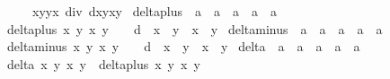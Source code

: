 \begin{isabellebody}
\ \ \ \ \ {\isacharparenleft}xyyx\ div\ {\isacharparenleft}{}{\isacharplus}d{\isacharasterisk}xyxy\isanewline
\isanewline
{}\isamarkupfalse%
\ delta{\isacharunderscore}plus\ {\isacharcolon}{\isacharcolon}\ {\isachardoublequoteopen}{\isacharprime}a\ {\isasymRightarrow}\ {\isacharprime}a\ {\isasymRightarrow}\ {\isacharprime}a\ {\isasymRightarrow}\ {\isacharprime}a\ {\isasymRightarrow}\ {\isacharprime}a{\isachardoublequoteclose}\ \isanewline
\ {\isachardoublequoteopen}delta{\isacharunderscore}plus\ x{}\ y{}\ x{}\ y{}\ {\isacharequal}\ {}\ {\isacharplus}\ d\ {\isacharasterisk}\ x{}\ {\isacharasterisk}\ y{}\ {\isacharasterisk}\ x{}\ {\isacharasterisk}\ y{}{\isachardoublequoteclose}\isanewline
\isanewline
{}\isamarkupfalse%
\ delta{\isacharunderscore}minus\ {\isacharcolon}{\isacharcolon}\ {\isachardoublequoteopen}{\isacharprime}a\ {\isasymRightarrow}\ {\isacharprime}a\ {\isasymRightarrow}\ {\isacharprime}a\ {\isasymRightarrow}\ {\isacharprime}a\ {\isasymRightarrow}\ {\isacharprime}a{\isachardoublequoteclose}\ \isanewline
\ {\isachardoublequoteopen}delta{\isacharunderscore}minus\ x{}\ y{}\ x{}\ y{}\ {\isacharequal}\ {}\ {\isacharminus}\ d\ {\isacharasterisk}\ x{}\ {\isacharasterisk}\ y{}\ {\isacharasterisk}\ x{}\ {\isacharasterisk}\ y{}{\isachardoublequoteclose}\isanewline
\isanewline
{}\isamarkupfalse%
\ delta\ {\isacharcolon}{\isacharcolon}\ {\isachardoublequoteopen}{\isacharprime}a\ {\isasymRightarrow}\ {\isacharprime}a\ {\isasymRightarrow}\ {\isacharprime}a\ {\isasymRightarrow}\ {\isacharprime}a\ {\isasymRightarrow}\ {\isacharprime}a{\isachardoublequoteclose}\ \isanewline
\ {\isachardoublequoteopen}delta\ x{}\ y{}\ x{}\ y{}\ {\isacharequal}\ {\isacharparenleft}delta{\isacharunderscore}plus\ x{}\ y{}\ x{}\ y{}{\isacharparenright}\ {\isacharasterisk}\ \isanewline

\end{isabellebody}
